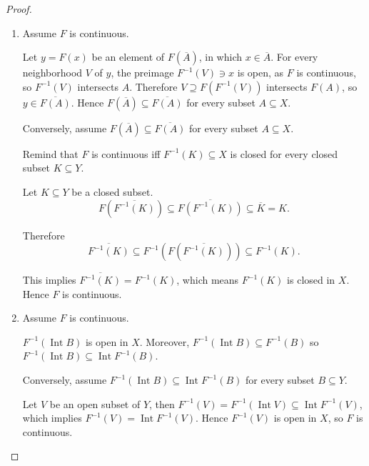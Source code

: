 \begin{proof}
    \begin{enumerate}[itemsep=0pt,label={(\alph*)}]
        \item Assume \( F \) is continuous.

              Let \( y = F(x) \) be an element of \( F(\overline{A}) \), in which \( x \in \overline{A} \). For every neighborhood \( V \) of \( y \), the preimage \( F^{-1}(V) \ni x \) is open, as \( F \) is continuous, so \( F^{-1}(V) \) intersects \( A \). Therefore \( V \supseteq F(F^{-1}(V)) \) intersects \( F(A) \), so \( y \in \overline{F(A)} \). Hence \( F(\overline{A}) \subseteq \overline{F(A)} \) for every subset \( A \subseteq X \).

              Conversely, assume \( F(\overline{A}) \subseteq \overline{F(A)} \) for every subset \( A \subseteq X \).

              Remind that \( F \) is continuous iff \( F^{-1}(K) \subseteq X \) is closed for every closed subset \( K \subseteq Y \).

              Let \( K \subseteq Y \) be a closed subset.
              \[
                  F(\overline{F^{-1}(K)}) \subseteq \overline{F(F^{-1}(K))} \subseteq \overline{K} = K.
              \]

              Therefore
              \[
                  \overline{F^{-1}(K)} \subseteq F^{-1}(F(\overline{F^{-1}(K)})) \subseteq F^{-1}(K).
              \]

              This implies \( \overline{F^{-1}(K)} = F^{-1}(K) \), which means \( F^{-1}(K) \) is closed in \( X \). Hence \( F \) is continuous.
        \item Assume \( F \) is continuous.

              \( F^{-1}(\operatorname{Int} B) \) is open in \( X \). Moreover, \( F^{-1}(\operatorname{Int} B) \subseteq F^{-1}(B) \) so \( F^{-1}(\operatorname{Int} B) \subseteq \operatorname{Int} F^{-1}(B) \).

              Conversely, assume \( F^{-1}(\operatorname{Int} B) \subseteq \operatorname{Int} F^{-1}(B) \) for every subset \( B \subseteq Y \).

              Let \( V \) be an open subset of \( Y \), then \( F^{-1}(V) = F^{-1}(\operatorname{Int} V) \subseteq \operatorname{Int} F^{-1}(V) \), which implies \( F^{-1}(V) = \operatorname{Int} F^{-1}(V) \). Hence \( F^{-1}(V) \) is open in \( X \), so \( F \) is continuous.
    \end{enumerate}
\end{proof}

